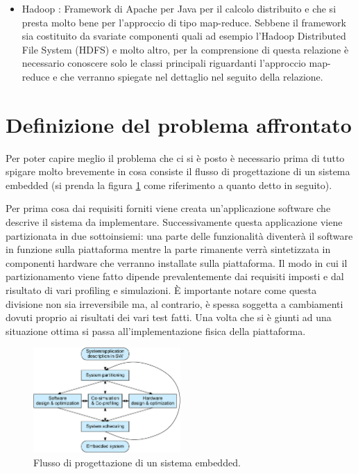 \documentclass[]{IEEEtran}
\begin{document}
\begin{itemize}
	\item Hadoop \cite{HADOOP}: Framework di Apache per Java per il calcolo distribuito e che si presta molto bene per l'approccio di tipo map-reduce. Sebbene il framework sia costituito da svariate componenti quali ad esempio l'Hadoop Distributed File System (HDFS) e molto altro, per la comprensione di questa relazione è necessario conoscere solo le classi principali riguardanti l'approccio map-reduce e che verranno spiegate nel dettaglio nel seguito della relazione.
\end{itemize}

\section{Definizione del problema affrontato}
Per poter capire meglio il problema che ci si è posto è necessario prima di tutto spigare molto brevemente in cosa consiste il flusso di progettazione di un sistema embedded (si prenda la figura \ref{pse} come riferimento a quanto detto in seguito).

Per prima cosa  dai requisiti forniti viene creata un'applicazione software che descrive il sistema da implementare. Successivamente questa applicazione viene partizionata in due sottoinsiemi: una parte delle funzionalità diventerà il software in funzione sulla piattaforma mentre la parte rimanente verrà sintetizzata in componenti hardware che verranno installate sulla piattaforma. Il modo in cui il partizionamento viene fatto dipende prevalentemente dai requisiti imposti e dal risultato di vari profiling e simulazioni. È importante notare come questa divisione non sia irreversibile ma, al contrario, è spessa soggetta a cambiamenti dovuti proprio ai risultati dei vari test fatti. Una volta che si è giunti ad una situazione ottima si passa all'implementazione fisica della piattaforma.
\begin{figure}[htp]
	\centering
	\includegraphics[width=0.5\textwidth]{images/embedded_sys_df.png}
	\caption{Flusso di progettazione di un sistema embedded.}
	\label{pse}
\end{figure}
\end{document}
